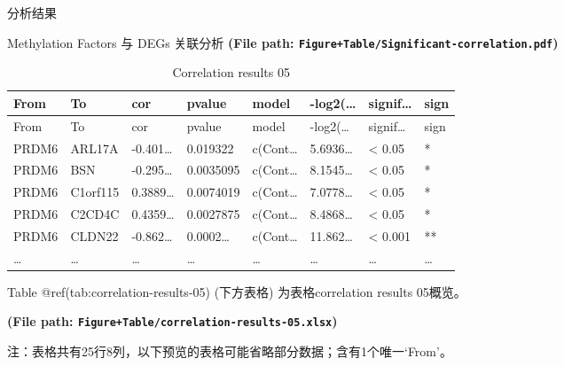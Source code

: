 \documentclass[
  ignorenonframetext,
]{beamer}
\begin{document}
\begin{frame}[fragile]{分析结果}
\begin{block}{Methylation Factors 与 DEGs 关联分析}
\textbf{(File path: \texttt{Figure+Table/Significant-correlation.pdf})}

\begin{center}\vspace{1.5cm}\end{center}

\begin{center}\vspace{1.5cm}\end{center}

\begin{longtable}[]{@{}llllllll@{}}
\caption{Correlation results 05}\tabularnewline
\toprule
From & To & cor & pvalue & model & -log2(\ldots{} & signif\ldots{} &
sign\tabularnewline
\midrule
\endfirsthead
\toprule
From & To & cor & pvalue & model & -log2(\ldots{} & signif\ldots{} &
sign\tabularnewline
\midrule
\endhead
PRDM6 & ARL17A & -0.401\ldots{} & 0.019322 & c(Cont\ldots{} &
5.6936\ldots{} & \textless{} 0.05 & *\tabularnewline
PRDM6 & BSN & -0.295\ldots{} & 0.0035095 & c(Cont\ldots{} &
8.1545\ldots{} & \textless{} 0.05 & *\tabularnewline
PRDM6 & C1orf115 & 0.3889\ldots{} & 0.0074019 & c(Cont\ldots{} &
7.0778\ldots{} & \textless{} 0.05 & *\tabularnewline
PRDM6 & C2CD4C & 0.4359\ldots{} & 0.0027875 & c(Cont\ldots{} &
8.4868\ldots{} & \textless{} 0.05 & *\tabularnewline
PRDM6 & CLDN22 & -0.862\ldots{} & 0.0002\ldots{} & c(Cont\ldots{} &
11.862\ldots{} & \textless{} 0.001 & **\tabularnewline
\ldots{} & \ldots{} & \ldots{} & \ldots{} & \ldots{} & \ldots{} &
\ldots{} & \ldots{}\tabularnewline
\bottomrule
\end{longtable}

Table @ref(tab:correlation-results-05) (下方表格) 为表格correlation
results 05概览。

\textbf{(File path: \texttt{Figure+Table/correlation-results-05.xlsx})}

\begin{center}\begin{tcolorbox}[colback=gray!10, colframe=gray!50, width=0.9\linewidth, arc=1mm, boxrule=0.5pt]注：表格共有25行8列，以下预览的表格可能省略部分数据；含有1个唯一`From'。
\end{tcolorbox}
\end{center}

\begin{center}\vspace{1.5cm}\end{center}


\end{block}
\end{frame}
\end{document}
